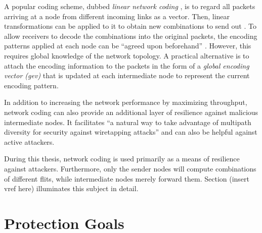 A popular coding scheme, dubbed \textit{linear network coding} \cite{li03linearnc}, is to regard all packets arriving at a node from different incoming links as a vector.
Then, linear transformations can be applied to it to obtain new combinations to send out \cite[1]{li03linearnc}. To allow receivers to decode the
combinations into the original packets, the encoding patterns applied at each node can be \enquote{agreed upon beforehand} \cite[1]{li03linearnc}.
However, this requires global knowledge of the network topology. A practical alternative is to attach the encoding information to the packets in the
form of a \textit{global encoding vector (\gls{gev})} \cites[2\psqq]{chou03practicalnc}[5\psq]{chou07ncforinternetandwireless} that is updated at each intermediate node to
represent the current encoding pattern.

In addition to increasing the network performance by maximizing throughput, network coding can also provide an additional layer of resilience against
malicious intermediate nodes. It facilitates \enquote{a natural way to take advantage of multipath diversity for security against wiretapping attacks}
\cite[8]{fragouli07ncfundamentals} and can also be helpful against active attackers.

During this thesis, network coding is used primarily as a means of resilience against attackers. Furthermore, only the sender nodes will compute
combinations of different flits, while intermediate nodes merely forward them. Section (insert vref here) illuminates this subject in detail.

\section{Protection Goals}\label{sec:protectiongoals}
